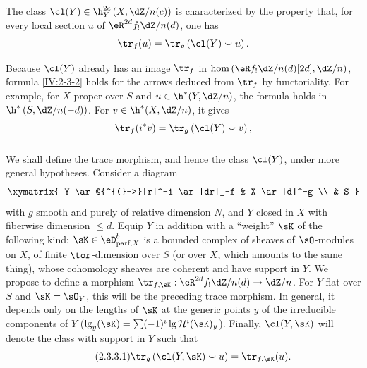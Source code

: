 \begin{definition}\label{IV:2-3-2}
The class $\cl(Y)\in\h_Y^{2 c}\left(X,\dZ/n(c)\right)$ is characterized by
the property that, for every local section $u$ of
$\eR^{2 d}f_! \dZ/n(d)$, one has
\[
  \tr_f(u) = \tr_g\left(\cl(Y)\smallsmile u\right) \text{.}
\]
\end{definition}

Because $\cl(Y)$ already has an image $\tr_f$ in
$\hom\left(\eR f_!\dZ/n(d)[2 d],\dZ/n\right)$, formula
\ref{IV:2-3-2} holds for the arrows deduced from $\tr_f$ by functoriality.
For example, for $X$ proper over $S$ and
$u\in \h^*(Y,\dZ/n)$, the formula holds in
$\h^*\left(S,\dZ/n(-d)\right)$. For
$v\in \h^*(X,\dZ/n)$, it gives
\[
  \tr_f(i^* v) = \tr_g\left(\cl(Y)\smallsmile v\right) \text{,}
\]






\subsubsection{}\label{IV:2-3-3}

We shall define the trace morphism, and hence the class $\cl(Y)$, under more
general hypotheses. Consider a diagram
\[\xymatrix{
  Y \ar@{^{(}->}[r]^-i \ar[dr]_-f
    & X \ar[d]^-g \\
  & S
}\]
with $g$ smooth and purely of relative dimension $N$, and $Y$ closed in $X$
with fiberwise dimension $\leqslant d$. Equip $Y$ in addition with a
``weight'' $\sK$ of the following kind:
$\sK\in\eD_{\text{parf},X}^b$ is a bounded complex of sheaves of
$\sO$-modules on $X$, of finite $\tor$-dimension over $S$ (or over $X$,
which amounts to the same thing), whose cohomology sheaves are coherent and
have support in $Y$. We propose to define a morphism
$\tr_{f,\sK}:\eR^{2 d}f_! \dZ/n(d) \to \dZ/n$. For $Y$ flat over $S$ and
$\sK=\sO_Y$, this will be the preceding trace morphism. In general, it
depends only on the lengths of $\sK$ at the generic points $y$ of the
irreducible components of
$Y$ ($\operatorname{lg}_y(\sK) = \sum (-1)^i \operatorname{lg} \mathcal{H}^i(\sK)_y$).
Finally, $\cl(Y,\sK)$ will denote the class with support in $Y$ such that
\begin{equation*}\tag{2.3.3.1}\label{IV:eq:2-3-3-1}
  \tr_g\left(\cl(Y,\sK)\smallsmile u\right) = \tr_{f,\sK}(u) \text{.}
\end{equation*}






